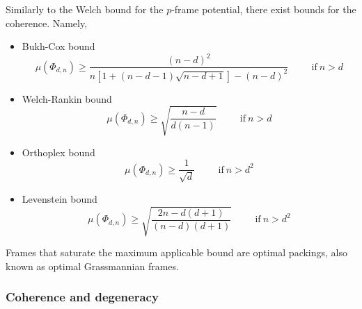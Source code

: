 \documentclass[%
superscriptaddress,
amsmath,amssymb,
 aps,
pra,
floatfix,
]{revtex4-2}
\begin{document}
Similarly to the Welch bound for the $p$-frame potential, there exist bounds for the coherence. Namely,
%
\begin{itemize}
    \item Bukh-Cox bound \cite{bukh2020nearly} \begin{equation}\label{eq:bukh}
        \mu(\Phi_{d, n}) \geq \frac{(n-d)^2}{n\left[1 + (n-d-1)\sqrt{n-d+1}\right] - (n-d)^2}\hspace{1cm}\mathrm{if}\ n > d
    \end{equation}
    \item Welch-Rankin bound \cite{welch1974lower, rankin1955the} \begin{equation}\label{eq:welchrankin}
        \mu(\Phi_{d, n}) \geq \sqrt{\frac{n-d}{d(n-1)}}\hspace{1cm}\mathrm{if}\ n > d
    \end{equation}
    \item Orthoplex bound \cite{conway2002packing} \begin{equation}\label{eq:orth}
        \mu(\Phi_{d, n}) \geq \frac{1}{\sqrt{d}}\hspace{1cm}\mathrm{if}\ n > d^2
    \end{equation}
    \item Levenstein bound \cite{levenshtein1982bounds} \begin{equation}\label{eq:leven}
        \mu(\Phi_{d, n}) \geq \sqrt{\frac{2n - d(d+1)}{(n-d)(d+1)}}\hspace{1cm}\mathrm{if}\ n > d^2
    \end{equation}
\end{itemize}
%
Frames that saturate the maximum applicable bound are optimal packings, also known as optimal Grassmannian frames.

\subsubsection{Coherence and degeneracy}
\label{subsubsec:degeneracy}
\end{document}
